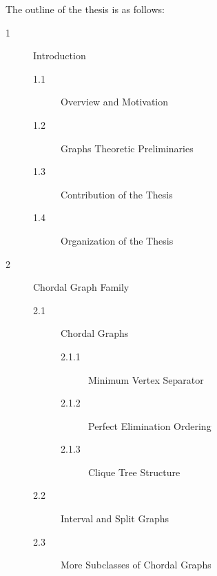 \singlespacing
The outline of the thesis is as follows:
\begin{description}

  \item[1] Introduction
          \begin{description}
              \item[1.1] Overview and Motivation 
              \item[1.2] Graphs Theoretic Preliminaries
              \item[1.3] Contribution of the Thesis
              \item[1.4] Organization of the Thesis
          \end{description}
                              

  \item[2] Chordal Graph Family
          \begin{description}
             \item[2.1] Chordal Graphs
                 \begin{description}
                    \item[2.1.1] Minimum Vertex Separator
                    \item[2.1.2] Perfect Elimination Ordering
                    \item[2.1.3] Clique Tree Structure
                 \end{description}
             \item[2.2] Interval  and Split Graphs
             \item[2.3] More Subclasses of Chordal Graphs
          \end{description}



\end{description}
